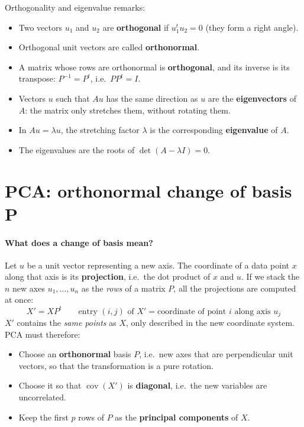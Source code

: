 Orthogonality and eigenvalue remarks:

\begin{itemize}
    \item Two vectors $u_1$ and $u_2$ are \textbf{orthogonal} if $u_1^t u_2 = 0$ (they form a right angle).
    \item Orthogonal unit vectors are called \textbf{orthonormal}.
    \item A matrix whose rows are orthonormal is \textbf{orthogonal}, and its inverse is its transpose: $P^{-1} = P^t$, i.e.\ $PP^t = I$.
    \item Vectors $u$ such that $Au$ has the same direction as $u$ are the \textbf{eigenvectors} of $A$: the matrix only stretches them, without rotating them.
    \item In $Au = \lambda u$, the stretching factor $\lambda$ is the corresponding \textbf{eigenvalue} of $A$.
    \item The eigenvalues are the roots of $\det(A - \lambda I) = 0$.
\end{itemize}

\section{PCA: orthonormal change of basis P}

\paragraph{What does a change of basis mean?}
Let $u$ be a unit vector representing a new axis. The coordinate of a data point $x$ along that axis is its \textbf{projection}, i.e.\ the dot product of $x$ and $u$. If we stack the $n$ new axes $u_1, \dots, u_n$ as the \emph{rows} of a matrix $P$, all the projections are computed at once:
\[
    X' = XP^t \qquad \text{entry } (i,j) \text{ of } X' = \text{coordinate of point } i \text{ along axis } u_j
\]
$X'$ contains the \emph{same points} as $X$, only described in the new coordinate system. PCA must therefore:

\begin{itemize}
    \item Choose an \textbf{orthonormal} basis $P$, i.e.\ new axes that are perpendicular unit vectors, so that the transformation is a pure rotation.
    \item Choose it so that $\operatorname{cov}(X')$ is \textbf{diagonal}, i.e.\ the new variables are uncorrelated.
    \item Keep the first $p$ rows of $P$ as the \textbf{principal components} of $X$.
\end{itemize}

